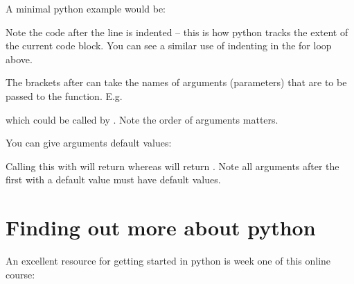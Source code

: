 \documentclass[letterpaper,10pt,english]{jupyterBook}
\begin{document}
\sphinxAtStartPar
A minimal python example would be:

\begin{sphinxVerbatim}[commandchars=\\\{\}]
 
\end{sphinxVerbatim}

\sphinxAtStartPar
Note the code after the  line is indented – this is how python tracks the extent of the current code block. You can see a similar use of indenting in the for loop above.

\sphinxAtStartPar
The brackets after  can take the names of arguments (parameters) that are to be passed to the function. E.g.

\begin{sphinxVerbatim}[commandchars=\\\{\}]
 
\end{sphinxVerbatim}

\sphinxAtStartPar
which could be called by . Note the order of arguments matters.

\sphinxAtStartPar
You can give arguments default values:

\begin{sphinxVerbatim}[commandchars=\\\{\}]
 
\end{sphinxVerbatim}

\sphinxAtStartPar
Calling this with  will return  whereas  will return . Note all arguments after the first with a default value must have default values.


\section{Finding out more about python}
\label{\detokenize{ProgInPython:finding-out-more-about-python}}
\sphinxAtStartPar
An excellent resource for getting started in python is week one of this online course: 
\end{document}
